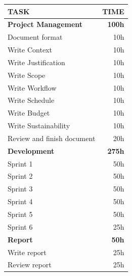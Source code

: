 \begin{table}
    \centering
    \begin{singlespace}
    \begin{tabular}{lr} 
    \toprule
    \textbf{TASK} & \textbf{TIME} \\
    \midrule
    \textbf{Project Management} & \textbf{100h} \\
    \midrule
    \hspace{3mm}Document format & 10h \\
    \hspace{3mm}Write Context & 10h \\
    \hspace{3mm}Write Justification & 10h \\
    \hspace{3mm}Write Scope & 10h \\
    \hspace{3mm}Write Workflow & 10h \\
    \hspace{3mm}Write Schedule & 10h \\
    \hspace{3mm}Write Budget & 10h \\
    \hspace{3mm}Write Sustainability & 10h \\
    \hspace{3mm}Review and finish document & 20h \\
    \midrule
    \textbf{Development} & \textbf{275h} \\
    \midrule
    \hspace{3mm}Sprint 1 & 50h \\
    \hspace{3mm}Sprint 2 & 50h \\
    \hspace{3mm}Sprint 3 & 50h \\
    \hspace{3mm}Sprint 4 & 50h \\
    \hspace{3mm}Sprint 5 & 50h \\
    \hspace{3mm}Sprint 6 & 25h \\
    \midrule
    \textbf{Report} & \textbf{50h} \\
    \midrule
    \hspace{3mm}Write report & 25h \\
    \hspace{3mm}Review report & 25h \\

\end{tabular}
\end{singlespace}
\end{table}
